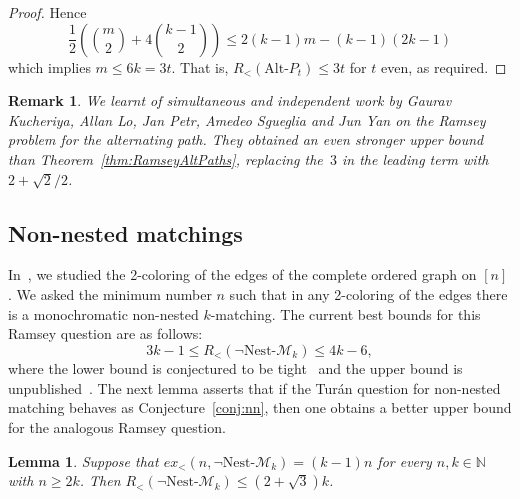 \documentclass[11pt]{article}
\newtheorem{lemma}[theorem]{Lemma}
\newtheorem{remark}[theorem]{Remark}
\theoremstyle{definition}
\begin{document}
\begin{proof}
    Hence 
    $$\frac{1}{2}\left(\binom{m}{2}+4\binom{k-1}{2}\right)\le 2(k-1)m-(k-1)(2k-1)$$
    which implies $m\le6k=3t$.
    That is, $R_<(\text{Alt-}P_{t})\le3t$ for $t$ even, as required.
\end{proof}

\begin{remark}
We learnt of simultaneous and independent work by Gaurav Kucheriya, Allan Lo, Jan Petr, Amedeo Sgueglia and Jun Yan on the Ramsey problem for the alternating path.
They obtained an even stronger upper bound than Theorem~\ref{thm:RamseyAltPaths}, replacing the~$3$ in the leading term with $2+\sqrt{2}/2$.
\end{remark}

\subsection{Non-nested matchings}

In~\cite{bgyt}, we studied the 2-coloring of the edges of the complete ordered graph on $[n]$. We asked the minimum number $n$ such that in any 2-coloring of the edges there is a monochromatic non-nested $k$-matching.
The current best bounds for this Ramsey question are as follows: 
$$3k-1\le R_<(\neg\text{Nest-}\mathcal M_k)\le4k-6,$$
where the lower bound is conjectured to be tight~\cite{bgyt} and the upper bound is unpublished~\cite{et25}.
The next lemma asserts that if the Tur{\'a}n question for non-nested matching behaves as Conjecture~\ref{conj:nn}, then one obtains a better upper bound for the analogous Ramsey question.

\begin{lemma}\label{lemma:nnestedRamsey}
    Suppose that $ex_<(n,\neg\text{Nest-}\mathcal M_k)=(k-1)n$ for every $n,k\in\mathbb N$ with $n\ge2k$.
    Then $R_<(\neg\text{Nest-}\mathcal M_k)\le(2+\sqrt{3})k$.
\end{lemma}
\end{document}
